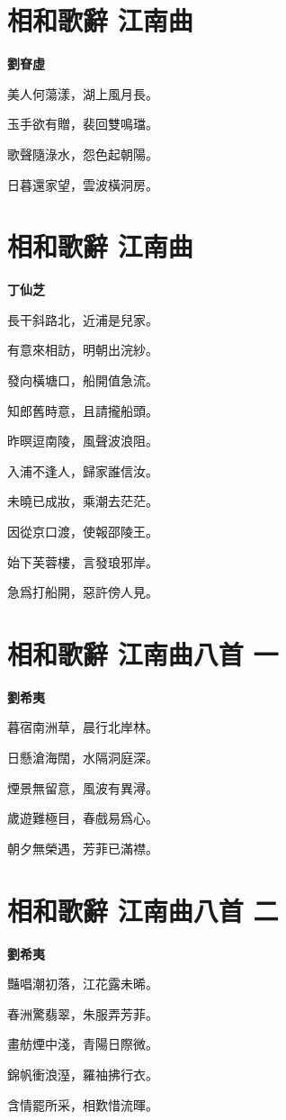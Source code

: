 \documentclass[12pt,a4paper]{ctexbook}
\begin{document}
\section{相和歌辭 江南曲}
\textbf{劉眘虛}\par\vspace{0.5em}
美人何蕩漾，湖上風月長。\par
玉手欲有贈，裴回雙鳴璫。\par
歌聲隨淥水，怨色起朝陽。\par
日暮還家望，雲波橫洞房。\par

\section{相和歌辭 江南曲}
\textbf{丁仙芝}\par\vspace{0.5em}
長干斜路北，近浦是兒家。\par
有意來相訪，明朝出浣紗。\par
發向橫塘口，船開值急流。\par
知郎舊時意，且請攏船頭。\par
昨暝逗南陵，風聲波浪阻。\par
入浦不逢人，歸家誰信汝。\par
未曉已成妝，乘潮去茫茫。\par
因從京口渡，使報邵陵王。\par
始下芙蓉樓，言發琅邪岸。\par
急爲打船開，惡許傍人見。\par

\section{相和歌辭 江南曲八首 一}
\textbf{劉希夷}\par\vspace{0.5em}
暮宿南洲草，晨行北岸林。\par
日懸滄海闊，水隔洞庭深。\par
煙景無留意，風波有異潯。\par
歲遊難極目，春戲易爲心。\par
朝夕無榮遇，芳菲已滿襟。\par

\section{相和歌辭 江南曲八首 二}
\textbf{劉希夷}\par\vspace{0.5em}
豔唱潮初落，江花露未晞。\par
春洲驚翡翠，朱服弄芳菲。\par
畫舫煙中淺，青陽日際微。\par
錦帆衝浪溼，羅袖拂行衣。\par
含情罷所采，相歎惜流暉。\par
\end{document}
